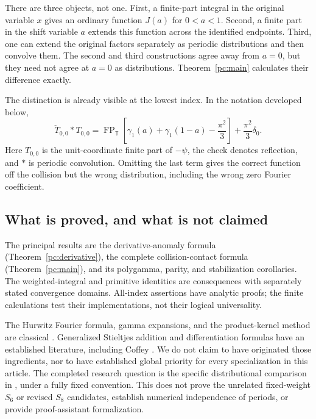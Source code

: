 \documentclass[11pt,a4paper]{article}
\numberwithin{equation}{section}
\theoremstyle{definition}
\newcommand{\T}{\mathbb T}
\newcommand{\FP}{\operatorname{FP}}
\begin{document}
There are three objects, not one. First, a finite-part integral in the original variable $x$ gives an ordinary function $J(a)$ for $0<a<1$. Second, a finite part in the shift variable $a$ extends this function across the identified endpoints. Third, one can extend the original factors separately as periodic distributions and then convolve them. The second and third constructions agree away from $a=0$, but they need not agree at $a=0$ as distributions. Theorem~\ref{pc:main} calculates their difference exactly.

The distinction is already visible at the lowest index. In the notation developed below,
\begin{equation}\label{pc:preview}
 \check T_{0,0}*T_{0,0}
 =\FP_{\T}\!\left[\gamma_1(a)+\gamma_1(1-a)-\frac{\pi^2}{3}\right]
   +\frac{\pi^2}{3}\delta_0.
\end{equation}
Here $T_{0,0}$ is the unit-coordinate finite part of $-\psi$, the check denotes reflection, and $*$ is periodic convolution. Omitting the last term gives the correct function off the collision but the wrong distribution, including the wrong zero Fourier coefficient.

\subsection{What is proved, and what is not claimed}
The principal results are the derivative-anomaly formula (Theorem~\ref{pc:derivative}), the complete collision-contact formula (Theorem~\ref{pc:main}), and its polygamma, parity, and stabilization corollaries. The weighted-integral and primitive identities are consequences with separately stated convergence domains. All-index assertions have analytic proofs; the finite calculations test their implementations, not their logical universality.

The Hurwitz Fourier formula, gamma expansions, and the product-kernel method are classical \cite{pc:DLMFhurwitz,pc:DLMFgamma,pc:EM}. Generalized Stieltjes addition and differentiation formulas have an established literature, including Coffey \cite{pc:Coffey}. We do not claim to have originated those ingredients, nor to have established global priority for every specialization in this article. The completed research question is the specific distributional comparison in \cite{pc:coincident}, under a fully fixed convention. This does not prove the unrelated fixed-weight $S_6$ or revised $S_8$ candidates, establish numerical independence of periods, or provide proof-assistant formalization.
\end{document}
